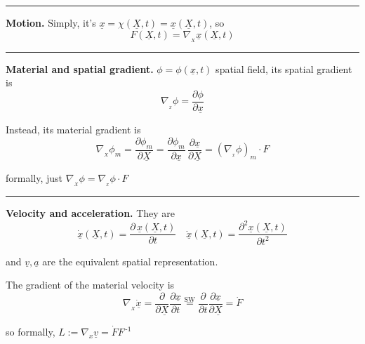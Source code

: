 \rule{0.31\textwidth}{0.2pt}
\smallskip

\textbf{Motion.} Simply, it's $\underline{x}=\chi(\underline{X},t)=\underline{x}(\underline{X},t)$, so
\begin{equation*}
F(\underline{X},t)=\nabla_{\!\! _X} \underline{x}(\underline{X},t)
\end{equation*}

\vspace{-1em}

\rule{0.31\textwidth}{0.2pt}
\smallskip

\textbf{Material and spatial gradient.} $\phi=\phi(\underline{x},t)$ spatial field, its spatial gradient is
\begin{equation*}
\nabla_{\!\!_x} \phi=\frac{\partial \phi}{\partial \underline{x}}
\end{equation*}

Instead, its material gradient is 
\begin{equation*}
\nabla_{\!\!_X} \phi_m=\frac{\partial \phi_m}{\partial \underline{X}}=\frac{\partial \phi_m}{\partial \underline{x}}\,\frac{\partial \underline{x}}{\partial \underline{X}}=\left( \nabla_{\!\!_x} \phi \right)_m \cdot F
\end{equation*}

formally, just $\boxed{\nabla_{\!\!_X} \phi=\nabla_{\!\!_x} \phi\cdot F}$

\rule{0.31\textwidth}{0.2pt}
\smallskip

\newcolumn

\textbf{Velocity and acceleration.} They are
\begin{equation*}
\dot{\underline{x}}(\underline{X},t)=\frac{\partial\, \underline{x}(\underline{X},t)}{\partial t} \quad  \ddot{\underline{x}}(\underline{X},t)=\frac{\partial^2 \underline{x}(\underline{X},t)}{\partial t^2}
\end{equation*}

and $\underline{v},\underline{a}$ are the equivalent spatial representation.

\smallskip

The gradient of the material velocity is
\begin{equation*}
\nabla_{\!\!_{X}} \dot{\underline{x}}=\frac{\partial}{\partial \underline{X}} \frac{\partial\underline{x}}{\partial t}\overset{\scriptstyle\text{SW}}{=} \frac{\partial}{\partial t} \frac{\partial \underline{x}}{\partial \underline{X}}=\dot{F}
\end{equation*}

so formally, $\boxed{L:=\nabla_{\!\!x}\underline{v}=\dot{F}F^{\,\text{-}1}}$ 

